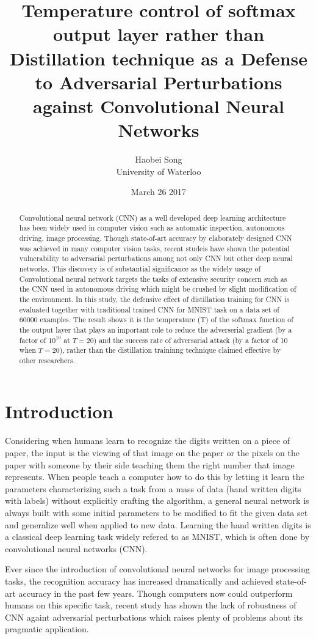 \documentclass{article}
\title{\textbf{Temperature control of softmax output layer rather than Distillation technique as a Defense to Adversarial Perturbations against Convolutional Neural Networks\cite{Papernot}}}
\author{Haobei Song \\
        University of Waterloo}
\date{March 26 2017}
\begin{document}
\maketitle
{}
\newpage
{}

\begin{abstract}
	Convolutional neural network (CNN) as a well developed deep learning architecture has been widely used in computer vision such as automatic inspection, autonomous driving, image processing. 
	Though state-of-art accuracy by elaborately designed CNN was achieved in many computer vision tasks, 
	recent studeis have shown the potential vulnerability to adversarial perturbations among not only CNN but other deep neural networks.
	This discovery is of substantial significance as the widely usage of Convolutional neural network targets the tasks of extensive security concern
	such as the CNN used in autonomous driving which might be crushed by slight modification of the environment. 
	In this study, the defensive effect of distillation training for CNN is evaluated together with traditional trained CNN for MNIST task on a data set of 60000 examples.
	The result shows it is the temperature (T) of the softmax function of the output layer that plays an important role to reduce the adverserial gradient (by a factor of $10^{10}$ at $T=20$) and the success rate of adversarial attack (by a factor of 10 when $T=20$),
 rather than the distillation traininng technique claimed effective by other researchers.
\end{abstract}
\section{Introduction}
Considering when humans learn to recognize the digits written on a piece of paper, the input is the viewing of that image on the paper or the pixels on the paper with someone by their side teaching them the right number that image represents.
When people teach a computer how to do this by letting it learn the parameters characterizing such a task from a mass of data (hand written digits with labels) without explicitly crafting the algorithm, 
a general neural network is always built with some initial parameters to be modified to fit the given data set and generalize well when applied to new data. Learning the hand written digits is a classical deep learning task widely refered to as MNIST, which is often done by convolutional neural networks (CNN).

Ever since the introduction of convolutional neural networks for image processing tasks, the recognition accuracy has increased dramatically and achieved state-of-art accuracy in the past few years. Though computers now could outperform humans on this specific task,
recent study has shown the lack of robustness of CNN againt adversarial perturbations which raises plenty of problems about its pragmatic application. 
\end{document}
